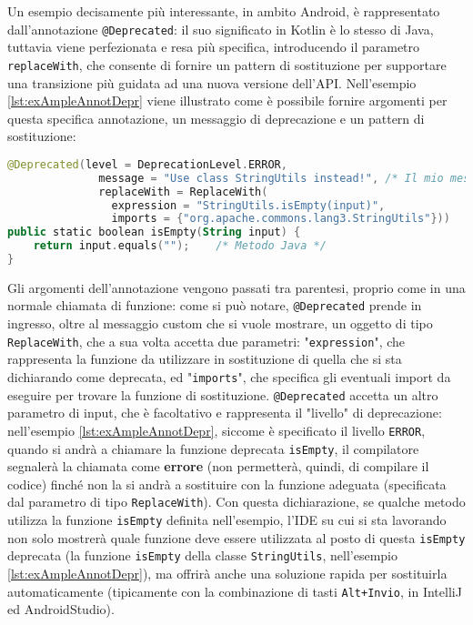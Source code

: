 Un esempio decisamente più interessante, in ambito Android, è rappresentato dall'annotazione \texttt{@Deprecated}: il suo significato in Kotlin è lo stesso di Java, tuttavia viene perfezionata e resa più specifica, introducendo il parametro \texttt{replaceWith}, che consente di fornire un pattern di sostituzione per supportare una transizione più guidata ad una nuova versione dell'API. Nell'esempio \ref{lst:exAmpleAnnotDepr} viene illustrato come è possibile fornire argomenti per questa specifica annotazione, un messaggio di deprecazione e un pattern di sostituzione:\\

\begin{lstlisting}[caption={Utilizzo dell'annotazione \texttt{@Deprecated}}, captionpos=b, label={lst:exAmpleAnnotDepr}, language=Kotlin]
@Deprecated(level = DeprecationLevel.ERROR,
        	  message = "Use class StringUtils instead!", /* Il mio messaggio */
        	  replaceWith = ReplaceWith(
                expression = "StringUtils.isEmpty(input)",
                imports = {"org.apache.commons.lang3.StringUtils"}))
public static boolean isEmpty(String input) {
    return input.equals("");    /* Metodo Java */
}
\end{lstlisting}

Gli argomenti dell'annotazione vengono passati tra parentesi, proprio come in una normale chiamata di funzione: come si può notare, \texttt{@Deprecated} prende in ingresso, oltre al messaggio custom che si vuole mostrare, un oggetto di tipo \texttt{ReplaceWith}, che a sua volta accetta due parametri: "\texttt{expression}", che rappresenta la funzione da utilizzare in sostituzione di quella che si sta dichiarando come deprecata, ed "\texttt{imports}", che specifica gli eventuali import da eseguire per trovare la funzione di sostituzione. \texttt{@Deprecated} accetta un altro parametro di input, che è facoltativo e rappresenta il "livello" di deprecazione: nell'esempio \ref{lst:exAmpleAnnotDepr}, siccome è specificato il livello \texttt{ERROR}, quando si andrà a chiamare la funzione deprecata \texttt{isEmpty}, il compilatore segnalerà la chiamata come {\bfseries errore} (non permetterà, quindi, di compilare il codice) finché non la si andrà a sostituire con la funzione adeguata (specificata dal parametro di tipo \texttt{ReplaceWith}). Con questa dichiarazione, se qualche metodo utilizza la funzione \texttt{isEmpty} definita nell’esempio, l'IDE su cui si sta lavorando non solo mostrerà quale funzione deve essere utilizzata al posto di questa \texttt{isEmpty} deprecata (la funzione \texttt{isEmpty} della classe \texttt{StringUtils}, nell'esempio \ref{lst:exAmpleAnnotDepr}), ma offrirà anche una soluzione rapida per sostituirla automaticamente (tipicamente con la combinazione di tasti \texttt{Alt+Invio}, in IntelliJ ed AndroidStudio).\\


